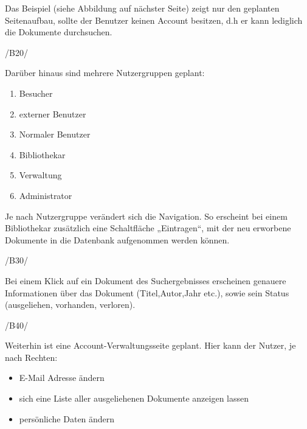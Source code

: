 Das Beispiel (siehe Abbildung auf nächster Seite) zeigt nur den geplanten Seitenaufbau, sollte der Benutzer keinen
Account besitzen, d.h er kann lediglich die Dokumente durchsuchen.

/B20/

Darüber hinaus sind mehrere Nutzergruppen geplant:

\begin{enumerate}
\item Besucher
\item externer Benutzer
\item Normaler Benutzer
\item Bibliothekar
\item Verwaltung
\item Administrator
\end{enumerate}

Je nach Nutzergruppe verändert sich die Navigation. So erscheint bei einem Bibliothekar zusätzlich eine 
Schaltfläche „Eintragen“, mit der neu erworbene Dokumente in die Datenbank aufgenommen werden können.


/B30/

Bei einem Klick auf ein Dokument des Suchergebnisses erscheinen genauere Informationen über das Dokument (Titel,Autor,Jahr etc.), sowie
sein Status (ausgeliehen, vorhanden, verloren).

/B40/

Weiterhin ist eine Account-Verwaltungsseite geplant.
\newline
\newline
Hier kann der Nutzer, je nach Rechten:

\begin{itemize}
\item E-Mail Adresse ändern
\item sich eine Liste aller ausgeliehenen Dokumente anzeigen lassen
\item persönliche Daten ändern
\end{itemize}





 
